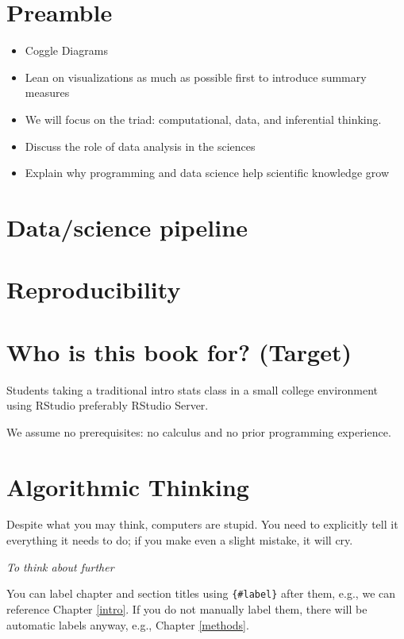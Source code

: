 \documentclass[]{tufte-book}
\providecommand{\tightlist}{%
  \setlength{\itemsep}{0pt}\setlength{\parskip}{0pt}}
\begin{document}
\section{Preamble}\label{preamble}

\begin{itemize}
\tightlist
\item
  Coggle Diagrams
\item
  Lean on visualizations as much as possible first to introduce summary
  measures
\item
  We will focus on the triad: computational, data, and inferential
  thinking.
\item
  Discuss the role of data analysis in the sciences
\item
  Explain why programming and data science help scientific knowledge
  grow
\end{itemize}

\section{Data/science pipeline}\label{datascience-pipeline}

\section{Reproducibility}\label{reproducibility}

\section{Who is this book for?
(Target)}\label{who-is-this-book-for-target}

Students taking a traditional intro stats class in a small college
environment using RStudio preferably RStudio Server.

We assume no prerequisites: no calculus and no prior programming
experience.

\section{Algorithmic Thinking}\label{algorithmic-thinking}

Despite what you may think, computers are stupid. You need to explicitly
tell it everything it needs to do; if you make even a slight mistake, it
will cry.

\emph{To think about further}

You can label chapter and section titles using \texttt{\{\#label\}}
after them, e.g., we can reference Chapter \ref{intro}. If you do not
manually label them, there will be automatic labels anyway, e.g.,
Chapter \ref{methods}.
\end{document}
